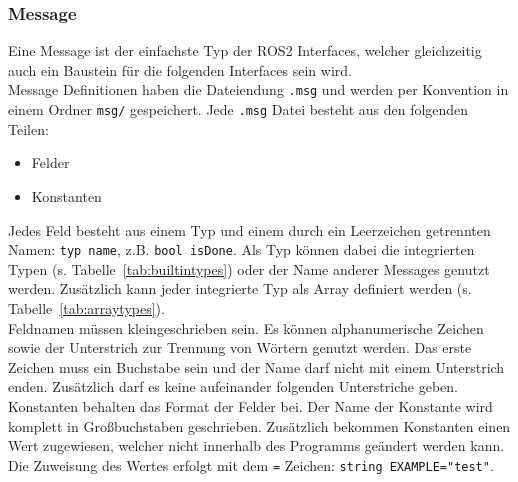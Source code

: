 \subsubsection{Message}
Eine Message ist der einfachste Typ der \ac{ROS2} Interfaces, welcher gleichzeitig auch ein Baustein für die folgenden Interfaces sein wird.\\
Message Definitionen haben die Dateiendung \verb|.msg| und werden per Konvention in einem Ordner \verb|msg/| gespeichert.
Jede \verb|.msg| Datei besteht aus den folgenden Teilen:
\begin{itemize}
\item Felder
\item Konstanten
\end{itemize}
Jedes Feld besteht aus einem Typ und einem durch ein Leerzeichen getrennten Namen: \verb|typ name|, z.B. \verb|bool isDone|.
Als Typ können dabei die integrierten Typen (s. Tabelle~\ref{tab:builtintypes}) oder der Name anderer Messages genutzt werden.
Zusätzlich kann jeder integrierte Typ als Array definiert werden (s. Tabelle~\ref{tab:arraytypes}).\\
Feldnamen müssen kleingeschrieben sein.
Es können alphanumerische Zeichen sowie der Unterstrich zur Trennung von Wörtern genutzt werden.
Das erste Zeichen muss ein Buchstabe sein und der Name darf nicht mit einem Unterstrich enden.
Zusätzlich darf es keine aufeinander folgenden Unterstriche geben.\\
Konstanten behalten das Format der Felder bei.
Der Name der Konstante wird komplett in Großbuchstaben geschrieben.
Zusätzlich bekommen Konstanten einen Wert zugewiesen, welcher nicht innerhalb des Programms geändert werden kann.
Die Zuweisung des Wertes erfolgt mit dem \verb|=| Zeichen: \verb|string EXAMPLE="test"|.
